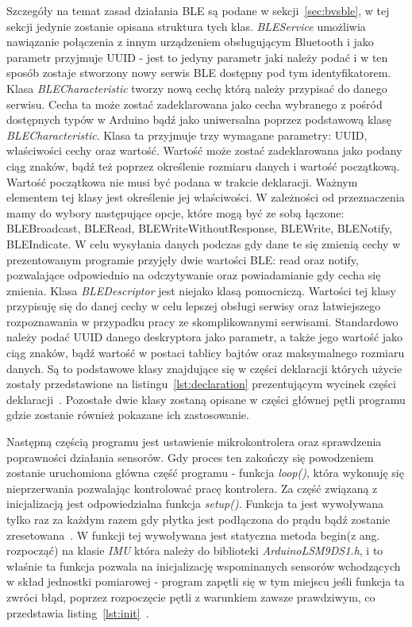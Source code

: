 Szczegóły na temat zasad działania BLE są podane w sekcji~\ref{sec:bvsble}, w tej sekcji jedynie zostanie opisana struktura tych klas. \textit{BLEService} umożliwia nawiązanie połączenia z innym urządzeniem obsługującym Bluetooth i jako parametr przyjmuje UUID - jest to jedyny parametr jaki należy podać i w ten sposób zostaje stworzony nowy serwis BLE dostępny pod tym identyfikatorem. Klasa \textit{BLECharacteristic} tworzy nową cechę którą należy przypisać do danego serwisu. Cecha ta może zostać zadeklarowana jako cecha wybranego z pośród dostępnych typów w Arduino bądź jako uniwersalna poprzez podstawową klasę \textit{BLECharacteristic}. Klasa ta przyjmuje trzy wymagane parametry: UUID, właściwości cechy oraz wartość. Wartość może zostać zadeklarowana jako podany ciąg znaków, bądź też poprzez określenie rozmiaru danych i wartość początkową. Wartość początkowa nie musi być podana w trakcie deklaracji. Ważnym elementem tej klasy jest określenie jej właściwości. W zależności od przeznaczenia mamy do wybory następujące opcje, które mogą być ze sobą łączone: BLEBroadcast, BLERead, BLEWriteWithoutResponse, BLEWrite, BLENotify, BLEIndicate. W celu wysyłania danych podczas gdy dane te się zmienią cechy w prezentowanym programie przyjęły dwie wartości BLE: read oraz notify, pozwalające odpowiednio na odczytywanie oraz powiadamianie gdy cecha się zmienia. Klasa \textit{BLEDescriptor} jest niejako klasą pomocniczą. Wartości tej klasy przypisuję się do danej cechy w celu lepszej obsługi serwisy oraz łatwiejszego rozpoznawania w przypadku pracy ze skomplikowanymi serwisami. Standardowo należy podać UUID danego deskryptora jako parametr, a także jego wartość jako ciąg znaków, bądź wartość w postaci tablicy bajtów oraz maksymalnego rozmiaru danych. Są to podstawowe klasy znajdujące się w części deklaracji których użycie zostały przedstawione na listingu~\ref{lst:declaration} prezentującym wycinek części deklaracji~\cite{ArduinoBLE}. Pozostałe dwie klasy zostaną opisane w części głównej pętli programu gdzie zostanie również pokazane ich zastosowanie. 

Następną częścią programu jest ustawienie mikrokontrolera oraz sprawdzenia poprawności działania sensorów. Gdy proces ten zakończy się powodzeniem zostanie uruchomiona główna część programu - funkcja \textit{loop()}, która wykonuję się nieprzerwania pozwalając kontrolować pracę kontrolera. Za część związaną z inicjalizacją jest odpowiedzialna funkcja \textit{setup()}. Funkcja ta jest wywoływana tylko raz za każdym razem gdy płytka jest podłączona do prądu bądź zostanie zresetowana~\cite{ArduinoDoc}. W funkcji tej wywoływana jest statyczna metoda begin(z ang. rozpocząć) na klasie \textit{IMU} która należy do biblioteki \textit{Arduino\textunderscore LSM9DS1.h}, i to właśnie ta funkcja pozwala na inicjalizację wspominanych sensorów wchodzących w skład jednostki pomiarowej - program zapętli się w tym miejscu jeśli funkcja ta zwróci błąd, poprzez rozpoczęcie pętli z warunkiem zawsze prawdziwym, co przedstawia listing~\ref{lst:init}~\cite{ArduinoIMU}.

